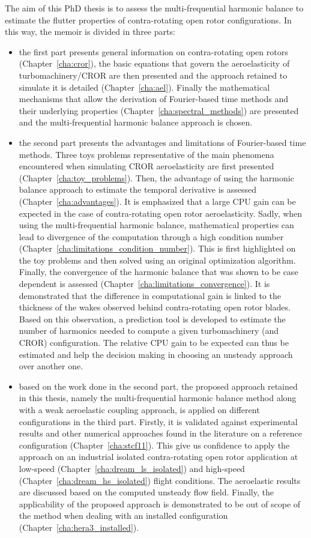 The aim of this PhD thesis is to assess the
multi-frequential harmonic balance
to estimate the flutter properties of contra-rotating open rotor
configurations. In this way, the memoir is divided in three parts:
\begin{itemize}
	\item the first part presents general information on 
	contra-rotating open rotors (Chapter~\ref{cha:cror}),
	the basic equations that govern the aeroelasticity of
	turbomachinery/CROR are then presented and the approach retained 
	to simulate it is detailed (Chapter~\ref{cha:ael}).
	Finally the mathematical mechanisms that allow the derivation
	of Fourier-based time methods and their underlying properties
	(Chapter~\ref{cha:spectral_methods}) are presented and the 
	multi-frequential harmonic balance approach is chosen.
	\item the second part presents the advantages and limitations
	of Fourier-based time methods. Three toys problems representative
	of the main phenomena encountered when simulating CROR
	aeroelasticity are first presented (Chapter~\ref{cha:toy_problems}).
	Then, the advantage of using the harmonic balance 
	approach to estimate the temporal derivative is assessed
	(Chapter~\ref{cha:advantages}). It is emphasized
	that a large CPU gain can be expected in the
	case of contra-rotating open rotor aeroelasticity. 
	Sadly, when using the multi-frequential harmonic
	balance, mathematical properties can lead to divergence
	of the computation through a high condition number
	(Chapter~\ref{cha:limitations_condition_number}). This is 
	first highlighted on the toy problems and then solved using
	an original optimization algorithm.
	Finally, the convergence of the harmonic balance 
	that was shown to be case dependent is
	assessed (Chapter~\ref{cha:limitations_convergence}). 
	It is demonstrated that the difference in computational
	gain is linked to the thickness of the wakes observed behind
	contra-rotating open rotor blades. Based on this observation,
	a prediction tool is developed to estimate the
	number of harmonics needed to compute a given turbomachinery (and CROR)
	configuration. The relative CPU gain to be expected can thus be estimated
	and help the decision making in choosing an unsteady approach
	over another one.
	\item based on the work done in the second part,
	the proposed approach retained in this thesis, 
	namely the multi-frequential harmonic balance method along with a weak 
	aeroelastic coupling approach, is applied on different configurations
	in the third part. Firstly, it is validated against experimental 
	results and other numerical approaches found in the
	literature on a reference configuration
	(Chapter~\ref{cha:stcf11}). This give us confidence
	to apply the approach on an industrial isolated contra-rotating
	open rotor application at low-speed (Chapter~\ref{cha:dream_ls_isolated})
	and high-speed (Chapter~\ref{cha:dream_hs_isolated})
	flight conditions. The aeroelastic results are discussed based
	on the computed unsteady flow field. Finally, the applicability
	of the proposed approach is demonstrated to be out of scope
	of the method when dealing with an installed configuration 
	(Chapter~\ref{cha:hera3_installed}).
\end{itemize}
